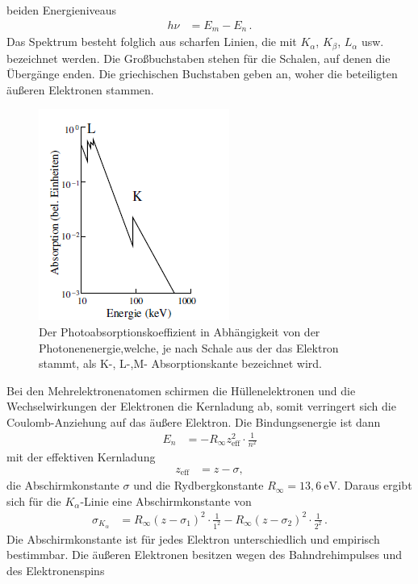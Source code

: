 beiden Energieniveaus
\begin{align}
    h \nu &= E_m - E_n \,.
\end{align}
Das Spektrum besteht folglich aus scharfen Linien, die mit 
$K_\alpha$, $K_\beta$, $L_\alpha$ usw. bezeichnet werden.
Die Großbuchstaben stehen für die Schalen, auf denen die Übergänge enden. Die griechischen Buchstaben geben an, woher die beteiligten äußeren Elektronen stammen.
\begin{figure}[H]
    \centering
    \includegraphics{Graphik.png}
    \caption{Der Photoabsorptionskoeffizient in Abhängigkeit von der Photonenenergie,welche, je nach Schale aus der das Elektron stammt, als K-, L-,M- Absorptionskante bezeichnet wird\protect\cite{AL}.}
    \label{fig:kontiSpektrum}
\end{figure}
Bei den Mehrelektronenatomen schirmen die Hüllenelektronen und die Wechselwirkungen der Elektronen die
Kernladung ab, somit verringert sich die Coulomb-Anziehung auf das äußere
Elektron. Die Bindungsenergie ist dann
\begin{align}
    E_n &= -R_\infty z_{\text{eff}}^2 \cdot \frac{1}{n^2}
\end{align}
mit der effektiven Kernladung 
\begin{align*}
    z_{\text{eff}} &= z - \sigma,
\end{align*}
die Abschirmkonstante $\sigma$ und die Rydbergkonstante $R_\infty = 13,6 \ \text{eV}$.
Daraus ergibt sich für die $K_\alpha$-Linie eine Abschirmkonstante
von
\begin{align}
    \sigma_{K_{\alpha}} &= R_\infty (z-\sigma_1)^2 \cdot \frac{1}{1^2} - R_\infty (z-\sigma_2)^2 \cdot \frac{1}{2^2} \,.
\end{align}
Die Abschirmkonstante ist für jedes Elektron unterschiedlich und empirisch bestimmbar.
Die äußeren Elektronen besitzen wegen des Bahndrehimpulses und des Elektronenspins
